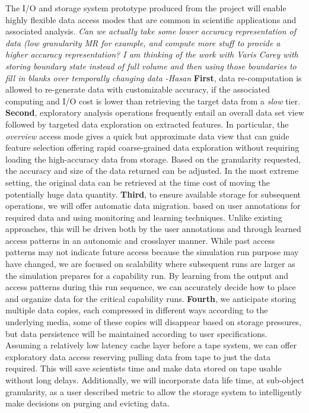 \documentclass[11pt,letterpaper]{article}
\newcommand{\hasan}[1]{{\it \color{darkgreen} #1 -Hasan }}
\newcommand{\hasan}[1]{}
\begin{document}
The I/O and storage system prototype produced from the project will enable
highly flexible data access modes that are common in scientific applications
and associated analysis.
%
\hasan{Can we actually take some lower accuracy representation of data (low
  granularity MR for example, and compute more stuff to provide a higher
  accuracy representation? I am thinking of the work with Varis Carey with
  storing boundary state instead of full volume and then using those
  boundaries to fill in blanks over temporally changing data}
%
\textbf{First}, data re-computation is allowed to re-generate data with
customizable accuracy, if the associated computing and I/O cost is lower
than retrieving the target data from a {\em slow} tier.
%
\textbf{Second}, exploratory analysis operations frequently entail an
overall data set view followed by targeted data exploration on extracted
features.  In particular, the {\em overview} access mode gives a quick but
approximate data view that can guide feature selection offering rapid
coarse-grained data exploration without requiring loading the high-accuracy
data from storage. Based on the granularity requested, the accuracy and size
of the data returned can be adjusted. In the most extreme setting, the
original data can be retrieved at the time cost of moving the potentially
huge data quantity.
%
\textbf{Third}, to ensure available storage for subsequent operations, we
will offer automatic data migration. based on user annotations for required data and using monitoring and learning techniques.  Unlike existing approaches, this will be
driven both by the user annotations and through learned access patterns in
an autonomic and crosslayer manner.  While past access patterns may not
indicate future access because the simulation run purpose may have changed,
we are focused on scalability where subsequent runs are larger as the
simulation prepares for a capability run.  By learning from the output and
access patterns during this run sequence, we can accurately decide how to
place and organize data for the critical capability runs.
%
\textbf{Fourth}, we anticipate storing multiple data copies, each compressed
in different ways according to the underlying media, some of these copies
will disappear based on storage pressures, but data persistence will be
maintained according to user specifications. Assuming a relatively low
latency cache layer before a tape system, we can offer exploratory data
access reserving pulling data from tape to just the data required. This will
save scientists time and make data stored on tape usable without long
delays. Additionally, we will incorporate data life time, at sub-object
granularity, as a user described metric to allow the storage system to
intelligently make decisions on purging and evicting data. 
\end{document}
